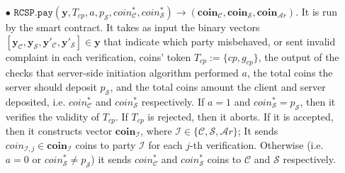 \begin{definition}[RC-S-P Scheme]
\begin{itemize}
\
	
	
\item[$\bullet$] $\mathtt{RCSP}.\mathtt{pay}(\bm{y},T_{\scriptscriptstyle cp},a,p_{\scriptscriptstyle\mathcal S}, coin^{\scriptscriptstyle *}_{\scriptscriptstyle\mathcal C},coin^{\scriptscriptstyle *}_{\scriptscriptstyle\mathcal S})\rightarrow ({\bm{coin}}_{\scriptscriptstyle\mathcal C},{\bm{coin}}_{\scriptscriptstyle\mathcal S},{\bm{coin}}_{\scriptscriptstyle\mathcal Ar})$. It is run by the smart contract. It takes as input the binary vectors $[\bm{y}_{\scriptscriptstyle \mathcal  C}, \bm{y}_{\scriptscriptstyle \mathcal  S},\bm{y}'_{\scriptscriptstyle \mathcal  C}, \bm{y}'_{\scriptscriptstyle \mathcal  S}]\in \bm{y}$ that indicate which party misbehaved, or sent invalid complaint  in each verification,  coins' token $T_{\scriptscriptstyle cp}:=\{cp,g_{\scriptscriptstyle cp}\}$, the output of the checks that server-side initiation algorithm  performed $a$, the total coins the server should deposit $p_{\scriptscriptstyle\mathcal S}$, and the total coins amount the client and server  deposited, i.e. $coin^{\scriptscriptstyle *}_{\scriptscriptstyle\mathcal C}$ and $coin^{\scriptscriptstyle *}_{\scriptscriptstyle\mathcal S}$ respectively. If $a=1$ and  $coin^{\scriptscriptstyle *}_{\scriptscriptstyle\mathcal S}= p_{\scriptscriptstyle\mathcal S}$, then it verifies the validity of $T_{\scriptscriptstyle cp}$. If $T_{\scriptscriptstyle cp}$ is rejected, then it aborts. 
If it is accepted, then it constructs  vector ${\bm{coin}}_{\scriptscriptstyle\mathcal I}$, where $\mathcal{I}\in\{\mathcal{C},\mathcal{S},\mathcal{A}r\}$; It sends ${{coin}}_{\scriptscriptstyle\mathcal{I},j}\in{\bm{coin}}_{\scriptscriptstyle\mathcal I}$ coins to party $\mathcal{I}$ for each $j$-th verification. Otherwise (i.e. $a=0$ or $coin^{\scriptscriptstyle *}_{\scriptscriptstyle\mathcal S}\neq p_{\scriptscriptstyle\mathcal S}$)  it  sends $coin^{\scriptscriptstyle *}_{\scriptscriptstyle\mathcal C}$ and  $coin^{\scriptscriptstyle *}_{\scriptscriptstyle\mathcal S}$ coins to $\mathcal C$ and $\mathcal S$ respectively. 	
	
	
	

\end{itemize}
\end{definition}
